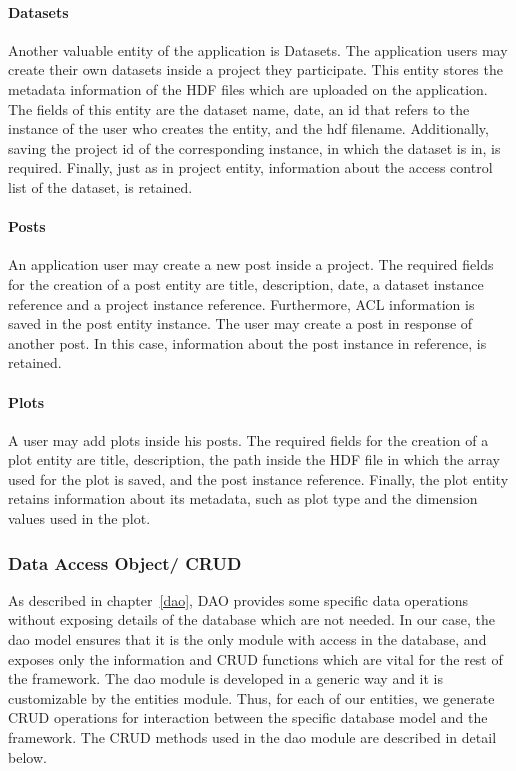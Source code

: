 \paragraph{Datasets}
Another valuable entity of the application is Datasets. The application users may create their own datasets inside a project they participate. This entity stores the metadata information of the HDF files which are uploaded on the application. The fields of this entity are the dataset name, date, an id that refers to the instance of the user who creates the entity, and the hdf filename. Additionally, saving the project id of the corresponding instance, in which the dataset is in, is required. Finally, just as in project entity, information about the access control list of the dataset, is retained.
\paragraph{Posts}
An application user may create a new post inside a project. The required fields for the creation of a post entity are title, description, date, a dataset instance reference and a project instance reference. Furthermore, ACL information  is saved in the post entity instance. The user may create a post in response of another post. In this case, information about the post instance in reference, is retained.
\paragraph{Plots}
A user may add plots inside his posts. The required fields for the creation of a plot entity are title, description, the path inside the HDF file in which the array used for the plot is saved, and the post instance reference. Finally, the plot entity retains information about its metadata, such as plot type and the dimension values used in the plot.

\subsubsection{Data Access Object/ CRUD}
\label{daocrud}
As described in chapter~\ref{dao}, DAO provides some specific data operations without exposing details of the database which are not needed. In our case, the dao model ensures that it is the only module with access in the database, and exposes only the information and CRUD functions which are vital for the rest of the framework. The dao module is developed in a generic way and it is customizable by the entities module. Thus, for each of our entities, we generate CRUD operations for interaction between the specific database model and the framework. The CRUD methods used in the dao module are described in detail below.

